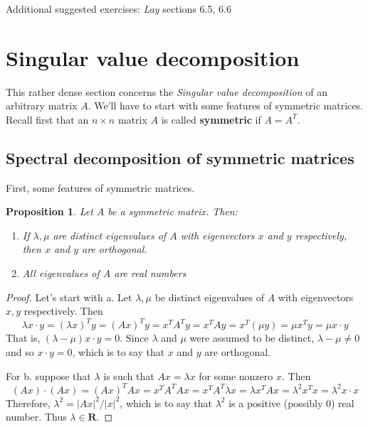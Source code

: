 \documentclass[12pt]{article}
\numberwithin{equation}{subsection}
\numberwithin{figure}{subsection}
\newtheorem{prop}[subsection]{Proposition}
\theoremstyle{note}
\newcommand{\R}{\mathbf{R}}
\begin{document}
Additional suggested exercises: \textit{Lay} sections 6.5, 6.6


\section{Singular value decomposition}
This rather dense section concerns the \textit{Singular value decomposition} of an arbitrary matrix $A$. We'll have to start with some features of symmetric matrices. Recall first that  an $n\times n$ matrix $A$ is called \textbf{symmetric} if $A=A^T$. 

\subsection{Spectral decomposition of symmetric matrices}
First, some features of symmetric matrices.
\begin{prop}
	Let  $A$ be a symmetric matrix.  Then:
	\begin{enumerate}
	\item If $\lambda, \mu$ are \textit{distinct} eigenvalues of $A$ with eigenvectors $x$ and $y$ respectively, then $x$ and $y$ are orthogonal. 
	\item All eigenvalues of $A$ are real numbers
	\end{enumerate}
	
\end{prop}
\begin{proof}
	Let's start with a. Let $\lambda,\mu$ be distinct eigenvalues of $A$ with eigenvectors $x,y$ respectively. Then \begin{equation} \lambda x\cdot y= (\lambda x)^T y=(Ax)^Ty=x^TA^Ty=x^TAy=x^T(\mu y)=\mu x^Ty=\mu x\cdot y\end{equation} That is, $(\lambda- \mu)x\cdot y=0$. Since $\lambda$ and $\mu$ were assumed to be distinct, $\lambda-\mu\neq 0$ and so $x\cdot y=0$, which is to say that $x$ and $y$ are orthogonal. 

	For b. suppose that $\lambda$ is such that $Ax=\lambda x$ for some nonzero $x$. Then \[ (Ax)\cdot (Ax)=(Ax)^TAx=x^T A^TAx=x^T A^T \lambda x=\lambda x^T Ax=\lambda^2 x^Tx=\lambda^2x\cdot x\]
	Therefore, $\lambda^2=|Ax|^2/|x|^2$, which is to say that $\lambda^2$ is a positive (possibly $0$) real number. Thus $\lambda\in \R$.\end{proof}
\end{document}
